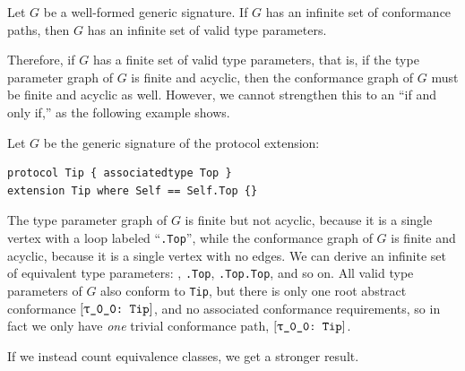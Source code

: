 \documentclass[../generics]{subfiles}
\begin{document}
\begin{proposition}
Let $G$ be a well-formed generic signature. If $G$ has an infinite set of conformance paths, then $G$ has an infinite set of valid type parameters.
\end{proposition}

Therefore, if $G$ has a finite set of valid type parameters, that is, if the type parameter graph of $G$ is finite and acyclic, then the conformance graph of $G$ must be finite and acyclic as well. However, we cannot strengthen this to an ``if and only if,'' as the following example shows.

\begin{example}
Let $G$ be the generic signature of the protocol extension:
\begin{Verbatim}
protocol Tip { associatedtype Top }
extension Tip where Self == Self.Top {}
\end{Verbatim}
The type parameter graph of $G$ is finite but not acyclic, because it is a single vertex with a loop labeled ``\texttt{.Top}'', while the conformance graph of $G$ is finite and acyclic, because it is a single vertex with no edges. We can derive an infinite set of equivalent type parameters: \rT, \texttt{\rT.Top}, \texttt{\rT.Top.Top}, and so on. All valid type parameters of $G$ also conform to \texttt{Tip}, but there is only one root abstract conformance $\ConfReq{\rT}{Tip}$, and no associated conformance requirements, so in fact we only have \emph{one} trivial conformance path, $\ConfReq{\rT}{Tip}$.
\end{example}

If we instead count equivalence classes, we get a stronger result.
\end{document}
